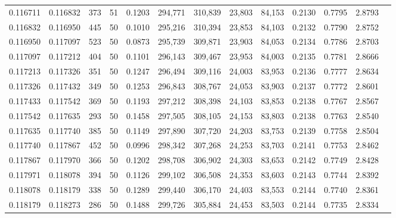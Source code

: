 \begin{tabular}{rrrrrrrrrrrrr}
0.116711 & 0.116832 &   373 &  51 &                                     0.1203 & 294,771 & 310,839 &  23,803 &  84,153 & 0.2130 & 0.7795 & 2.8793 \\
0.116832 & 0.116950 &   445 &  50 &                                     0.1010 & 295,216 & 310,394 &  23,853 &  84,103 & 0.2132 & 0.7790 & 2.8752 \\
0.116950 & 0.117097 &   523 &  50 &                                     0.0873 & 295,739 & 309,871 &  23,903 &  84,053 & 0.2134 & 0.7786 & 2.8703 \\
0.117097 & 0.117212 &   404 &  50 &                                     0.1101 & 296,143 & 309,467 &  23,953 &  84,003 & 0.2135 & 0.7781 & 2.8666 \\
0.117213 & 0.117326 &   351 &  50 &                                     0.1247 & 296,494 & 309,116 &  24,003 &  83,953 & 0.2136 & 0.7777 & 2.8634 \\
0.117326 & 0.117432 &   349 &  50 &                                     0.1253 & 296,843 & 308,767 &  24,053 &  83,903 & 0.2137 & 0.7772 & 2.8601 \\
0.117433 & 0.117542 &   369 &  50 &                                     0.1193 & 297,212 & 308,398 &  24,103 &  83,853 & 0.2138 & 0.7767 & 2.8567 \\
0.117542 & 0.117635 &   293 &  50 &                                     0.1458 & 297,505 & 308,105 &  24,153 &  83,803 & 0.2138 & 0.7763 & 2.8540 \\
0.117635 & 0.117740 &   385 &  50 &                                     0.1149 & 297,890 & 307,720 &  24,203 &  83,753 & 0.2139 & 0.7758 & 2.8504 \\
0.117740 & 0.117867 &   452 &  50 &                                     0.0996 & 298,342 & 307,268 &  24,253 &  83,703 & 0.2141 & 0.7753 & 2.8462 \\
0.117867 & 0.117970 &   366 &  50 &                                     0.1202 & 298,708 & 306,902 &  24,303 &  83,653 & 0.2142 & 0.7749 & 2.8428 \\
0.117971 & 0.118078 &   394 &  50 &                                     0.1126 & 299,102 & 306,508 &  24,353 &  83,603 & 0.2143 & 0.7744 & 2.8392 \\
0.118078 & 0.118179 &   338 &  50 &                                     0.1289 & 299,440 & 306,170 &  24,403 &  83,553 & 0.2144 & 0.7740 & 2.8361 \\
0.118179 & 0.118273 &   286 &  50 &                                     0.1488 & 299,726 & 305,884 &  24,453 &  83,503 & 0.2144 & 0.7735 & 2.8334 \\

\end{tabular}
